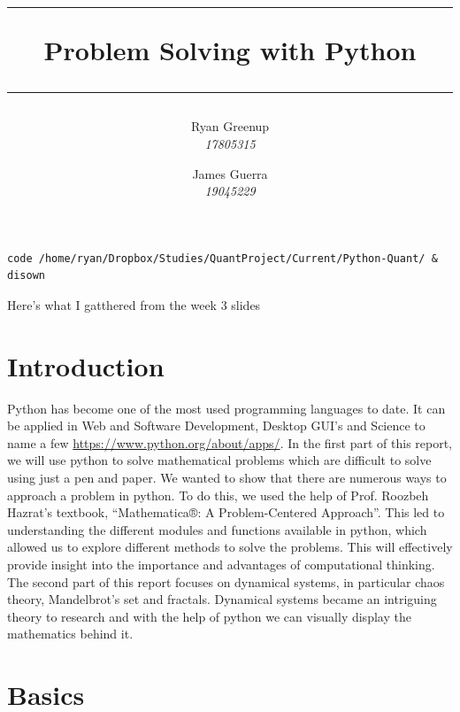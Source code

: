 \documentclass[11pt]{article}
\author{
    \LARGE{
    Ryan Greenup\\
    \Large
    \textit{17805315}
    }
    \and
    \LARGE{
    James Guerra\\
    \Large
    \textit{19045229}
    }
    \vspace{30mm}
}
\date{}
\title{
    \rule{\textwidth}{1pt}
    \Huge\textbf{Problem Solving with Python}
    \rule{\textwidth}{1pt}
    \vspace{30mm}
    }
\begin{document}
\maketitle

\begin{figure}[b]
\end{figure}

\newpage
\tableofcontents    
\newpage

\begin{verbatim}
code /home/ryan/Dropbox/Studies/QuantProject/Current/Python-Quant/ & disown
\end{verbatim}

Here's what I gatthered from the week 3 slides

\section{Introduction}
\label{sec:org1de827a}
Python has become one of the most used programming languages to date. It can be applied in Web and Software Development, Desktop GUI’s and Science to name a few \href{https://www.python.org/about/apps/}{https://www.python.org/about/apps/}. In the first part of this report, we will use python to solve mathematical problems which are difficult to solve using just a pen and paper. We wanted to show that there are numerous ways to approach a problem in python. To do this, we used the help of Prof. Roozbeh Hazrat’s textbook, “Mathematica®: A Problem-Centered Approach”. This led to understanding the different modules and functions available in python, which allowed us to explore different methods to solve the problems. This will effectively provide insight into the importance and advantages of computational thinking. The second part of this report focuses on dynamical systems, in particular chaos theory, Mandelbrot's set and fractals. Dynamical systems became an intriguing theory to research and with the help of python we can visually display the mathematics behind it.

\section{Basics}
\label{sec:orge9c184f}
\end{document}
